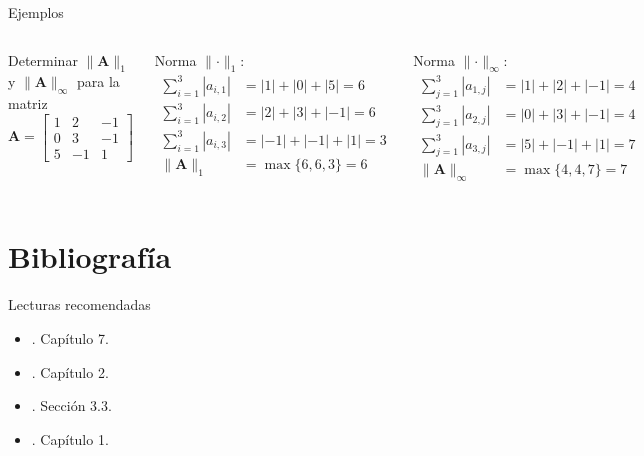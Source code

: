 \documentclass[9pt, aspectratio=169]{beamer}
\begin{document}
\begin{frame}{Ejemplos}
\begin{columns}[t]
\cx
Determinar $\lVert \bm{A} \rVert_{1}$ y $\lVert \bm{A} \rVert_{\infty}$ para la matriz
\[ \bm{A} = \begin{bmatrix}
  1 & 2 & -1 \\
  0 & 3 & -1 \\
  5 & -1 & 1
\end{bmatrix} \]

Norma $\lVert \cdot \rVert_1$:
\begin{align*}
  \sum_{i=1}^3 |a_{i,1}| &= |1| + |0| + |5| = 6 \\
  \sum_{i=1}^3 |a_{i,2}| &= |2| + |3| + |-1| = 6 \\
  \sum_{i=1}^3 |a_{i,3}| &= |-1| + |-1| + |1| = 3 \\
  \lVert \bm{A} \rVert_1 &= \max \{6, 6, 3\} = 6
\end{align*}

\cx
Norma $\lVert \cdot \rVert_{\infty}$: 
\begin{align*}
  \sum_{j=1}^3 |a_{1,j}| &= |1| + |2| + |-1| = 4 \\
  \sum_{j=1}^3 |a_{2,j}| &= |0| + |3| + |-1| = 4 \\
  \sum_{j=1}^3 |a_{3,j}| &= |5| + |-1| + |1| = 7 \\
  \lVert \bm{A} \rVert_{\infty} &= \max \{4, 4, 7\} = 7
\end{align*}

\end{columns}
\end{frame}

\section*{Bibliografía}
\begin{frame}{Lecturas recomendadas}
\begin{itemize}
  \item {}. Capítulo 7.
  \item {}. Capítulo 2.
  \item {}. Sección 3.3.
  \item {}. Capítulo 1.
\end{itemize}
\end{frame}
\end{document}
